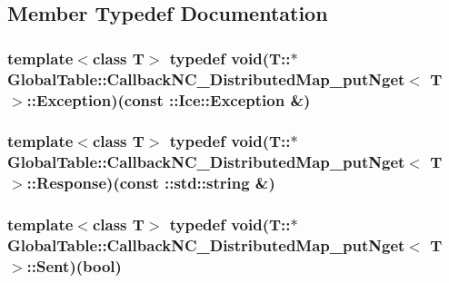 \subsection{Member Typedef Documentation}
\hypertarget{class_global_table_1_1_callback_n_c___distributed_map__put_nget_a980c60b282bce6f892681856c3bf80f9}{
\subsubsection[{Exception}]{\setlength{\rightskip}{0pt plus 5cm}template$<$class T$>$ typedef void(T::$\ast$ {\bf GlobalTable::CallbackNC\_\-DistributedMap\_\-putNget}$<$ T $>$::{\bf Exception})(const ::Ice::Exception \&)}}
\label{class_global_table_1_1_callback_n_c___distributed_map__put_nget_a980c60b282bce6f892681856c3bf80f9}
\hypertarget{class_global_table_1_1_callback_n_c___distributed_map__put_nget_add8ea77c4ddeceea21ef6446f089e8a5}{
\subsubsection[{Response}]{\setlength{\rightskip}{0pt plus 5cm}template$<$class T$>$ typedef void(T::$\ast$ {\bf GlobalTable::CallbackNC\_\-DistributedMap\_\-putNget}$<$ T $>$::{\bf Response})(const ::std::string \&)}}
\label{class_global_table_1_1_callback_n_c___distributed_map__put_nget_add8ea77c4ddeceea21ef6446f089e8a5}
\hypertarget{class_global_table_1_1_callback_n_c___distributed_map__put_nget_ab35fdf71fb5a996677b4a7c079a00f6f}{
\subsubsection[{Sent}]{\setlength{\rightskip}{0pt plus 5cm}template$<$class T$>$ typedef void(T::$\ast$ {\bf GlobalTable::CallbackNC\_\-DistributedMap\_\-putNget}$<$ T $>$::{\bf Sent})(bool)}}
